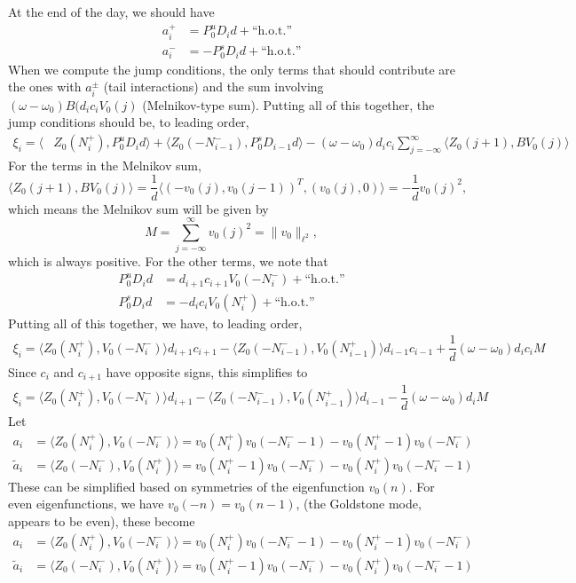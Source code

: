 \documentclass[12pt]{article}
\begin{document}
At the end of the day, we should have
\begin{align*}
a_i^+ &= P_0^u D_i d + \text{``h.o.t.''} \\
a_i^- &= -P_0^s D_i d + \text{``h.o.t.''}
\end{align*}
When we compute the jump conditions, the only terms that should contribute are the ones with $a_i^\pm$ (tail interactions) and the sum involving $(\omega - \omega_0) B (d_i c_i V_0(j)$ (Melnikov-type sum). Putting all of this together, the jump conditions should be, to leading order, 
\begin{equation}\label{eq:xieq}
\begin{aligned}
\xi_i = \langle &Z_0(N_i^+), P_0^u D_i d \rangle 
+ \langle Z_0(-N_{i-1}^-), P_0^s D_{i-1} d \rangle 
- (\omega - \omega_0) d_i c_i \sum_{j = -\infty}^{\infty} \langle Z_0(j+1), B V_0(j)\rangle
\end{aligned}
\end{equation}
For the terms in the Melnikov sum,
\[
\langle Z_0(j+1), B V_0(j)\rangle = \frac{1}{d} \langle (-v_0(j), v_0(j-1))^T, (v_0(j), 0) \rangle
= -\frac{1}{d}v_0(j)^2,
\]
which means the Melnikov sum will be given by
\begin{equation}\label{eq:M}
M = \sum_{j = -\infty}^{\infty} v_0(j)^2 = \| v_0 \|_{\ell^2},
\end{equation}
which is always positive. For the other terms, we note that
\begin{align*}
P_0^u D_i d &= d_{i+1} c_{i+1} V_0(-N_i^-) + \text{``h.o.t.''} \\
P_0^s D_i d &= -d_i c_i V_0(N_i^+) + \text{``h.o.t.''}
\end{align*}
Putting all of this together, we have, to leading order,
\begin{align*}
\xi_i = \langle Z_0(N_i^+), V_0(-N_i^-) \rangle d_{i+1} c_{i+1}
- \langle Z_0(-N_{i-1}^-), V_0(N_{i-1}^+) \rangle d_{i-1} c_{i-1}
+ \dfrac{1}{d} (\omega - \omega_0) d_i c_i M
\end{align*}
Since $c_i$ and $c_{i+1}$ have opposite signs, this simplifies to 
\begin{align*}
\xi_i = \langle Z_0(N_i^+), V_0(-N_i^-) \rangle d_{i+1}
- \langle Z_0(-N_{i-1}^-), V_0(N_{i-1}^+) \rangle d_{i-1}
- \dfrac{1}{d} (\omega - \omega_0) d_i M
\end{align*}
Let
\begin{align*}
a_i &= \langle Z_0(N_i^+), V_0(-N_i^-) \rangle 
= v_0(N_i^+)v_0(-N_i^- - 1) - v_0(N_i^+ - 1)v_0(-N_i^-)\\
\tilde{a}_i &= \langle Z_0(-N_i^-), V_0(N_i^+) \rangle 
= v_0(N_i^+ - 1)v_0(-N_i^-) - v_0(N_i^+)v_0(-N_i^- - 1)
\end{align*}
These can be simplified based on symmetries of the eigenfunction $v_0(n)$. For even eigenfunctions, we have $v_0(-n) = v_0(n-1)$, (the Goldstone mode, appears to be even), these become
\begin{align*}
a_i &= \langle Z_0(N_i^+), V_0(-N_i^-) \rangle 
= v_0(N_i^+)v_0(-N_i^- - 1) - v_0(N_i^+ - 1)v_0(-N_i^-)\\
\tilde{a}_i &= \langle Z_0(-N_i^-), V_0(N_i^+) \rangle 
= v_0(N_i^+ - 1)v_0(-N_i^-) - v_0(N_i^+)v_0(-N_i^- - 1)
\end{align*}
\end{document}
